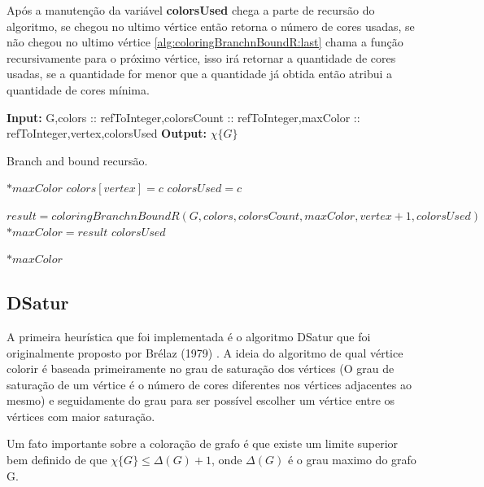 \documentclass[12pt]{article}
\begin{document}
Após a manutenção da variável \textbf{colorsUsed} chega a parte de recursão do algoritmo, se chegou no ultimo vértice então retorna o número de cores usadas, se não chegou no ultimo vértice \ref{alg:coloringBranchnBoundR:last} chama a função recursivamente para o próximo vértice, isso irá retornar a quantidade de cores usadas, se a quantidade for menor que a quantidade já obtida então atribui a quantidade de cores mínima.

\begin{algorithm}
\textbf{Input:} G,colors :: refToInteger,colorsCount :: refToInteger,maxColor :: refToInteger,vertex,colorsUsed
\textbf{Output:} $\chi \{G \}$
\caption{Branch and bound recursão.}\label{alg:coloringBranchnBoundR}
\begin{algorithmic}[1]
\State \Return $*maxColor$
\EndIf
{}\label{alg:coloringBranchnBoundR:for1}
    \label{alg:coloringBranchnBoundR:adjnotsamecolor}
        \State $colors[vertex] = c$\label{alg:coloringBranchnBoundR:color}
        \State $colorsUsed=c$
	\EndIf

	\label{alg:coloringBranchnBoundR:last}
	    \State $result=coloringBranchnBoundR(G,colors,colorsCount,maxColor,vertex+1,colorsUsed)$
		\State $*maxColor=result$
	    \EndIf
	\Else
	\State \Return $colorsUsed$
	\EndIf
    \EndIf
\EndFor

\State \Return $*maxColor$
\EndProcedure
\end{algorithmic}
\end{algorithm}

\subsection{DSatur}
\label{sec:org01027fa}
A primeira heurística que foi implementada é o algoritmo DSatur que foi originalmente proposto por Brélaz (1979) \cite{Lewis2016}. A ideia do algoritmo de qual vértice colorir é baseada primeiramente no grau de saturação dos vértices (O grau de saturação de um vértice é o número de cores diferentes nos vértices adjacentes ao mesmo) e seguidamente do grau para ser possível escolher um vértice entre os vértices com maior saturação.

Um fato importante sobre a coloração de grafo é que existe um limite superior bem definido de que \(\chi\{G\}\leq \Delta(G)+1\), onde \(\Delta(G)\) é o grau maximo do grafo G.
\end{document}
